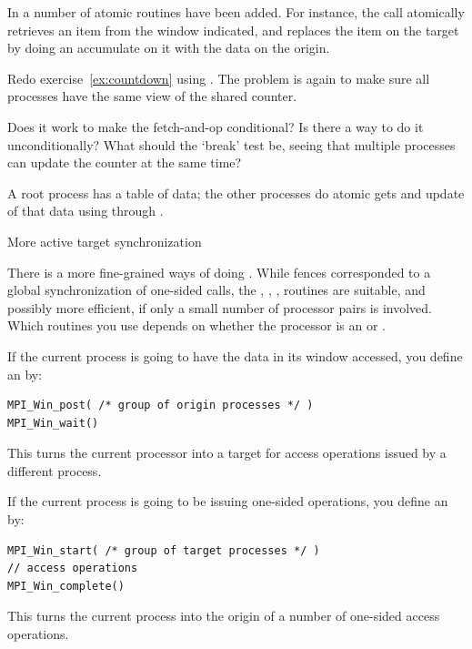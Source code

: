 In  a number of atomic routines have been added.
For instance,
the  call atomically retrieves an item from the window
indicated, and replaces the item on the target by doing an accumulate on it
with the data on the origin.
%

\begin{exercise}
  \label{ex:countdownop}
  Redo exercise~\ref{ex:countdown} using . The
  problem is again to make sure all processes have the same view of
  the shared counter.

  Does it work to make the fetch-and-op conditional? Is there a way to
  do it unconditionally? What should the `break' test be, seeing that
  multiple processes can update the counter at the same time?
\end{exercise}

A root process has a table of data; the other processes do 
atomic gets and update of that data using  through .
%
%

 {More active target synchronization}
\label{sec:post-wait}

There is a more fine-grained ways of doing 
. While fences
corresponded to a global synchronization of one-sided calls,
the ,
, ,  routines
are suitable, and possibly more efficient,
if only a small number of processor pairs is
involved.  Which routines
you use depends on whether the processor is an  or
.

If the current process is going to have the data in its window accessed,
you define an  by:
\begin{lstlisting}
MPI_Win_post( /* group of origin processes */ )
MPI_Win_wait()
\end{lstlisting}
This turns the current processor into a target for access operations issued
by a different process.

If the current process is going to be issuing one-sided operations,
you define an  by:
\begin{lstlisting}
MPI_Win_start( /* group of target processes */ )
// access operations
MPI_Win_complete()
\end{lstlisting}
This turns the current process into the origin of a number of
one-sided access operations.

